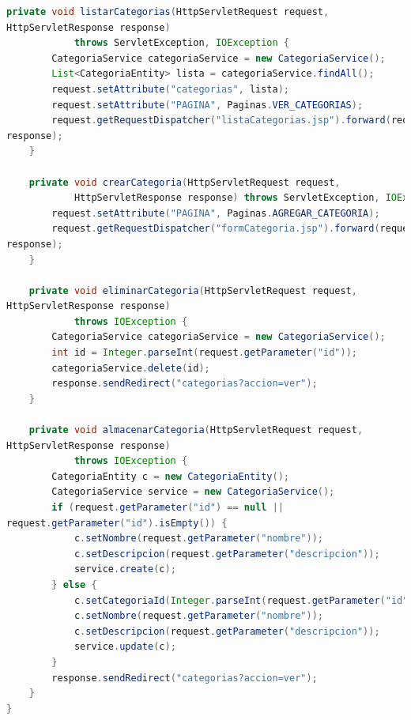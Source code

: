 \documentclass[a4paper,12pt]{article}
\begin{document}
\begin{lstlisting}[language=Java, style=customJava, 
caption={CategoriasServlet.java}, 
captionpos=b,basicstyle=\fontfamily{cmss}\small]
    private void listarCategorias(HttpServletRequest request, 
HttpServletResponse response)
            throws ServletException, IOException {
        CategoriaService categoriaService = new CategoriaService();
        List<CategoriaEntity> lista = categoriaService.findAll();
        request.setAttribute("categorias", lista);
        request.setAttribute("PAGINA", Paginas.VER_CATEGORIAS);
        request.getRequestDispatcher("listaCategorias.jsp").forward(request, 
response);
    }

    private void crearCategoria(HttpServletRequest request,
            HttpServletResponse response) throws ServletException, IOException {
        request.setAttribute("PAGINA", Paginas.AGREGAR_CATEGORIA);
        request.getRequestDispatcher("formCategoria.jsp").forward(request, 
response);
    }

    private void eliminarCategoria(HttpServletRequest request, 
HttpServletResponse response)
            throws IOException {
        CategoriaService categoriaService = new CategoriaService();
        int id = Integer.parseInt(request.getParameter("id"));
        categoriaService.delete(id);
        response.sendRedirect("categorias?accion=ver");
    }

    private void almacenarCategoria(HttpServletRequest request, 
HttpServletResponse response)
            throws IOException {
        CategoriaEntity c = new CategoriaEntity();
        CategoriaService service = new CategoriaService();
        if (request.getParameter("id") == null || 
request.getParameter("id").isEmpty()) {
            c.setNombre(request.getParameter("nombre"));
            c.setDescripcion(request.getParameter("descripcion"));
            service.create(c);
        } else {
            c.setCategoriaId(Integer.parseInt(request.getParameter("id")));
            c.setNombre(request.getParameter("nombre"));
            c.setDescripcion(request.getParameter("descripcion"));
            service.update(c);
        }
        response.sendRedirect("categorias?accion=ver");
    }
}
\end{lstlisting}
\end{document}
